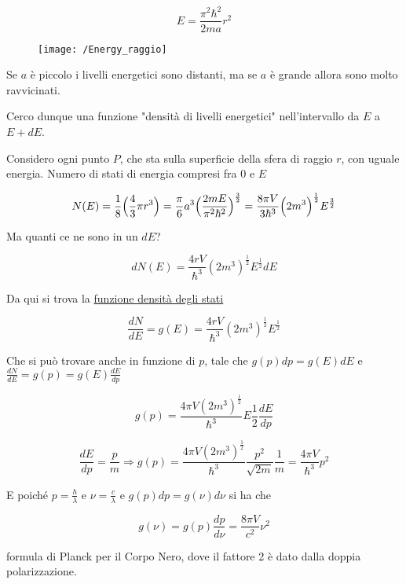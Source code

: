 $$ E = \frac{\pi^2 \hbar^2}{2 m a} r^2 $$

\begin{figure}[h]
\centering
\texttt{[image: /Energy\_raggio]}
\end{figure}

Se $a$ è piccolo i livelli energetici sono distanti, ma se $a$ è grande allora sono molto ravvicinati.

Cerco dunque una funzione "densità di livelli energetici" nell'intervallo da $E$ a $E+dE$.

Considero ogni punto $P$, che sta sulla superficie della sfera di raggio $r$, con uguale energia.
Numero di stati di energia compresi fra $0$ e $E$ 

$$ N(E) = \frac{1}{8} \Bigl( \frac{4}{3} \pi r^3 \Bigr) = \frac{\pi}{6} a^3 \Bigl( \frac{2 m E}{\pi^2 \hbar^2} \Bigr) ^{\frac{3}{2}} = 
\frac{8 \pi V}{3 \hbar^3} \Bigl(2 m^3 \Bigr) ^{\frac{1}{2}} E^{\frac{3}{2}} $$

Ma quanti ce ne sono in un $dE$? 

$$ dN(E) = \frac{4 r V}{\hbar^3} (2 m^3)^{\frac{1}{2}} E^{\frac{1}{2}} dE $$

Da qui si trova la \underline{funzione densità degli stati}

$$ \frac{dN}{dE} = g(E) = \frac{4 r V}{\hbar^3} (2 m^3)^{\frac{1}{2}} E^{\frac{1}{2}} $$

Che si può trovare anche in funzione di $p$, tale che 
$ g(p) dp = g(E) dE $ e $  \frac{dN}{dE} = g(p) = g(E)  \frac{dE}{dp} $

$$ g(p) = \frac{4 \pi V (2m^3)^\frac{1}{2}}{\hbar^3}  E\frac{1}{2} \frac{dE}{dp}$$

$$ \frac{dE}{dp} = \frac{p}{m}  \Longrightarrow g(p) = \frac{4 \pi V (2m^3)^{\frac{1}{2}}}{\hbar^3} \frac{p^2}{\sqrt{2m}} \frac{1}{m} = \frac{4 \pi V}{\hbar^3} p^2 $$

E poiché $ p = \frac{h}{\lambda} $ e $ \nu = \frac{c}{\lambda} $ e $ g(p) dp = g(\nu) d\nu $ si ha che

$$ g(\nu) = g(p) \frac{dp}{d\nu} = \frac{8 \pi V}{c^2} \nu^2 $$

formula di Planck per il Corpo Nero, dove il fattore 2 è dato dalla doppia polarizzazione.









